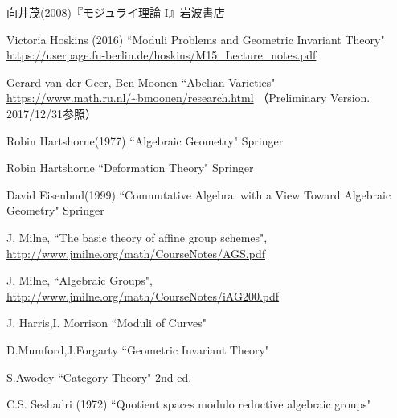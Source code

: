 \documentclass[a4paper]{jsarticle}
\begin{document}
\begin{thebibliography}{99}
    向井茂(2008)『モジュライ理論 I』岩波書店
    
    Victoria Hoskins (2016)
    ``Moduli Problems and Geometric Invariant Theory"
    \url{https://userpage.fu-berlin.de/hoskins/M15_Lecture_notes.pdf}

    Gerard van der Geer, Ben Moonen
    ``Abelian Varieties"
    \url{https://www.math.ru.nl/~bmoonen/research.html}
    （Preliminary Version. 2017/12/31参照）

    Robin Hartshorne(1977)
    ``Algebraic Geometry"
    Springer

    Robin Hartshorne
    ``Deformation Theory"
    Springer

    David Eisenbud(1999)
    ``Commutative Algebra: with a View Toward Algebraic Geometry"
    Springer
    
    J. Milne, ``The basic theory of affine group schemes", 
    \url{http://www.jmilne.org/math/CourseNotes/AGS.pdf}
    
    J. Milne, ``Algebraic Groups", 
    \url{http://www.jmilne.org/math/CourseNotes/iAG200.pdf}

    J. Harris,I. Morrison ``Moduli of Curves"

    D.Mumford,J.Forgarty ``Geometric Invariant Theory"

    S.Awodey ``Category Theory" 2nd ed.

    C.S. Seshadri (1972)
    ``Quotient spaces modulo reductive algebraic groups"

\end{thebibliography}
\end{document}
